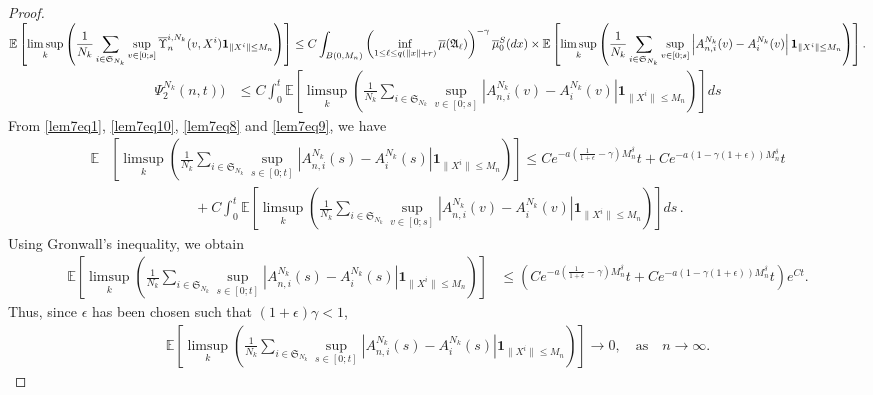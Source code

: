 \documentclass[notitlepage,reqno,11pt]{amsart}
\numberwithin{equation}{section}
\begin{document}
\begin{proof}
$\displaystyle \mathbb{E}\left[\limsup_{k}\left(\frac{1}{N_k}\sum_{i\in\mathfrak{S}_{N_k}}\sup_{v\in[0;s]} \overline{\Upsilon}_n^{i,N_k}(v,X^i )\mathbf{1}_{\|X^i\|\leq M_n}\right)\right]\leq  C\int_{B(0,M_n)} \displaystyle\left( \inf_{1\leq \ell \leq q(\|x\|+r)}\overline{\mu}(\mathfrak{A}_\ell)\right)^{-\gamma} \overline{\mu}^{S}_0 (dx)\\
\displaystyle  \times \mathbb{E}\left[\displaystyle \limsup_{k}\left(\frac{1}{N_k}\sum_{i\in\mathfrak{S}_{N_k}}\sup_{v\in[0;s]}\left| A_{n,i}^{N_k}(v)-A_{i}^{N_k}(v)\right|\mathbf{1}_{\|X^i\|\leq M_n}\right)\right].$
 \begin{align}
  \label{lem7eq9}
\Psi^{N_k}_2(n,t))&\leq C\int_0^t \mathbb{E}\left[\displaystyle \limsup_{k}\left(\frac{1}{N_k}\sum_{i\in\mathfrak{S}_{N_k}}\sup_{v\in[0;s]}\left| A_{n,i}^{N_k}(v)-A_{i}^{N_k}(v)\right|\mathbf{1}_{\|X^i\|\leq M_n}\right)\right]ds 
\end{align} 
From \eqref{lem7eq1}, \eqref{lem7eq10}, \eqref{lem7eq8} and  \eqref{lem7eq9}, we have
\begin{align*}  
\mathbb{E}&\left[\displaystyle\limsup_{k}\left(\displaystyle\frac{1}{N_k}\sum_{i\in\mathfrak{S}_{N_k}}\sup_{s\in[0;t]}\left| A^{N_k}_{n,i}(s)-A^{N_k}_{i}(s)\right|\mathbf{1}_{\|X^i\|\leq M_n}\right)\right]\leq C e^{-a(\frac{1}{1+\epsilon}-\gamma)M_n^{\delta}} t+ C e^{-a(1-\gamma(1+\epsilon))M_n^{\delta}}t\\
 &\quad\quad\quad\quad\quad\quad+C\int_0^t \mathbb{E} \left[\displaystyle \limsup_{k}\left(\frac{1}{N_k}\sum_{i\in\mathfrak{S}_{N_k}}\sup_{v\in[0;s]}\left| A_{n,i}^{N_k}(v)-A_{i}^{N_k}(v)\right|\mathbf{1}_{\|X^i\|\leq M_n}\right)\right]ds\,.
 \end{align*}
 Using Gronwall's inequality, we obtain
 \begin{align}
  \mathbb{E}\left[\displaystyle\limsup_{k}\left(\displaystyle\frac{1}{N_k}\sum_{i\in\mathfrak{S}_{N_k}}\sup_{s\in[0;t]}\left| A^{N_k}_{n,i}(s)-A^{N_k}_{i}(s)\right|\mathbf{1}_{\|X^i\|\leq M_n}\right)\right]&\leq\left( C e^{-a(\frac{1}{1+\epsilon}-\gamma)M_n^{\delta}} t+ C e^{-a(1-\gamma(1+\epsilon))M_n^{\delta}}t\right)e^{Ct}\nonumber.
 \end{align}
 Thus, since $\epsilon$ has been chosen such that $(1+\epsilon)\gamma<1$,
\begin{align*}
\mathbb{E}\left[\displaystyle\limsup_{k}\left(\displaystyle\frac{1}{N_k}\sum_{i\in\mathfrak{S}_{N_k}}\sup_{s\in[0;t]}\left| A^{N_k}_{n,i}(s)-A^{N_k}_{i}(s)\right|\mathbf{1}_{\|X^i\|\leq M_n}\right)\right] \rightarrow 0,\quad \text{as} \quad n\rightarrow \infty.
\end{align*}
\end{proof}
\end{document}
